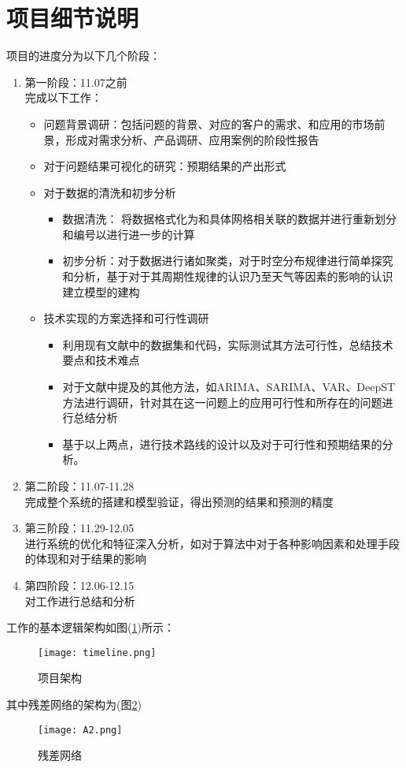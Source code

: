 \section{项目细节说明}
项目的进度分为以下几个阶段：
\begin{enumerate}
  \item 第一阶段：11.07之前\\
  完成以下工作：
  \begin{itemize}
    \item 问题背景调研：包括问题的背景、对应的客户的需求、和应用的市场前景，形成对需求分析、产品调研、应用案例的阶段性报告
    \item 对于问题结果可视化的研究：预期结果的产出形式
    \item 对于数据的清洗和初步分析
    \begin{itemize}
      \item 数据清洗： 将数据格式化为和具体网格相关联的数据并进行重新划分和编号以进行进一步的计算
      \item 初步分析：对于数据进行诸如聚类，对于时空分布规律进行简单探究和分析，基于对于其周期性规律的认识乃至天气等因素的影响的认识建立模型的建构
    \end{itemize}
    \item 技术实现的方案选择和可行性调研
    \begin{itemize}
      \item 利用现有文献中的数据集和代码，实际测试其方法可行性，总结技术要点和技术难点
      \item 对于文献中提及的其他方法，如ARIMA、SARIMA、VAR、DeepST方法进行调研，针对其在这一问题上的应用可行性和所存在的问题进行总结分析
      \item 基于以上两点，进行技术路线的设计以及对于可行性和预期结果的分析。
    \end{itemize}
  \end{itemize}
  \item 第二阶段：11.07-11.28\\
  完成整个系统的搭建和模型验证，得出预测的结果和预测的精度
  \item 第三阶段：11.29-12.05\\
  进行系统的优化和特征深入分析，如对于算法中对于各种影响因素和处理手段的体现和对于结果的影响
  \item 第四阶段：12.06-12.15\\
  对工作进行总结和分析
\end{enumerate}
工作的基本逻辑架构如图(\ref{fig:A1})所示：
\begin{figure}[ht]
\centering
\texttt{[image: timeline.png]}
\caption{项目架构}
\label{fig:A1}
\end{figure}
其中残差网络的架构为(图\ref{fig:A2})
\begin{figure}[ht]
\centering
\texttt{[image: A2.png]}
\caption{残差网络}
\label{fig:A2}
\end{figure}